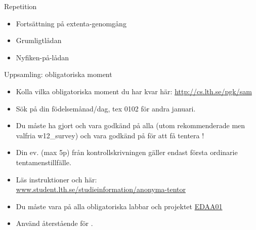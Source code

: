 \newcommand{\legend}[2][]{
    \begin{scope}[#1]
    \path
        \foreach \n/\s in {#2}
            {
                  ++(0,-10pt) node[\s,legend box] {} +(5pt,0) node[legend label] {\n}
            }
    ;
    \end{scope}
}


\ifkompendium\else


\begin{Slide}{Repetition}
  \begin{itemize}
    \item Fortsättning på extenta-genomgång
    \item Grumligtlådan
    \item Nyfiken-på-lådan
  \end{itemize}
\end{Slide}


\begin{Slide}{Uppsamling: obligatoriska moment}\SlideFontSmall
\begin{itemize}
\item Kolla vilka obligatoriska moment du har kvar här:
\url{http://cs.lth.se/pgk/sam}
\item Sök på din födelsemånad/dag, tex 0102 för andra januari.
\item Du måste ha gjort  och vara godkänd på alla  (utom rekommenderade men valfria w12\_survey) och vara godkänd på  för att få tentera !
\item Din ev.  (max 5p) från kontrollskrivningen gäller endast första ordinarie tentamenstillfälle.
\item Läs  instruktioner  och  här: \\
\href{http://www.student.lth.se/studieinformation/anonyma-tentor/}{www.student.lth.se/studieinformation/anonyma-tentor}
\item Du måste vara  på alla obligatoriska labbar och projektet  \href{http://cs.lth.se/edaa01vt}{EDAA01}
\item Använd återstående  för .
\end{itemize}
\end{Slide}

